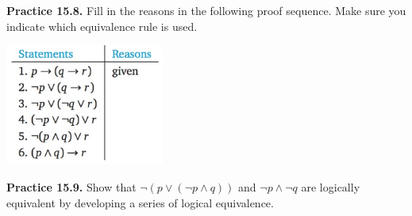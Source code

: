\documentclass[aspectratio=169]{beamer}
\begin{document}
\begin{frame}[plain]{ }

{\bf Practice 15.8.}  
  Fill in the reasons in the following proof sequence. Make sure you indicate which 
     equivalence rule is used.
     \begin{center}
       \includegraphics[height=4cm]{./img/lecture15-fig4.png}
     \end{center}
 \vspace{.5in}

 \end{frame}
 

 \begin{frame}[plain]{}
 
 
  {\bf Practice 15.9.}  Show that $\neg (p\vee (\neg p\wedge q))$ and $\neg p \wedge \neg q$ are logically
       equivalent by developing a series of logical equivalence.\ \ 
 
 \vspace{2in}
 
\end{frame}

\end{document}

